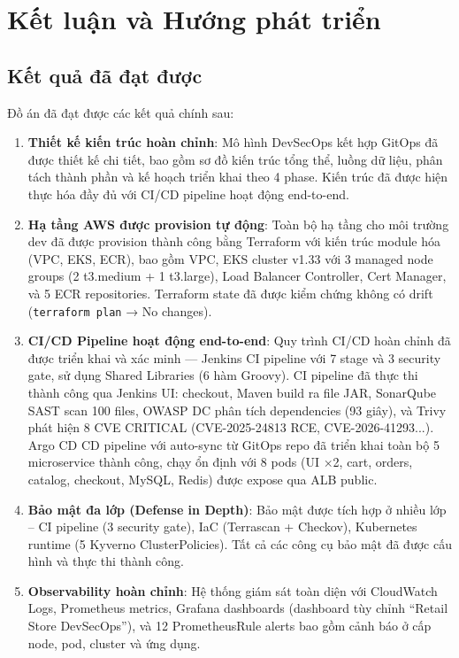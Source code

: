 \documentclass[13pt,a4paper,twoside]{extarticle}
\begin{document}
\section{Kết luận và Hướng phát triển}

\subsection{Kết quả đã đạt được}

Đồ án đã đạt được các kết quả chính sau:

\begin{enumerate}[leftmargin=*,nosep]
  \item \textbf{Thiết kế kiến trúc hoàn chỉnh}: Mô hình DevSecOps kết hợp GitOps đã được thiết kế chi tiết, bao gồm sơ đồ kiến trúc tổng thể, luồng dữ liệu, phân tách thành phần và kế hoạch triển khai theo 4 phase. Kiến trúc đã được hiện thực hóa đầy đủ với CI/CD pipeline hoạt động end-to-end.

  \item \textbf{Hạ tầng AWS được provision tự động}: Toàn bộ hạ tầng cho môi trường dev đã được provision thành công bằng Terraform với kiến trúc module hóa (VPC, EKS, ECR), bao gồm VPC, EKS cluster v1.33 với 3 managed node groups (2 t3.medium + 1 t3.large), Load Balancer Controller, Cert Manager, và 5 ECR repositories. Terraform state đã được kiểm chứng không có drift (\texttt{terraform plan} → No changes).

  \item \textbf{CI/CD Pipeline hoạt động end-to-end}: Quy trình CI/CD hoàn chỉnh đã được triển khai và xác minh --- Jenkins CI pipeline với 7 stage và 3 security gate, sử dụng Shared Libraries (6 hàm Groovy). CI pipeline đã thực thi thành công qua Jenkins UI: checkout, Maven build ra file JAR, SonarQube SAST scan 100 files, OWASP DC phân tích dependencies (93 giây), và Trivy phát hiện 8 CVE CRITICAL (CVE-2025-24813 RCE, CVE-2026-41293...). Argo CD CD pipeline với auto-sync từ GitOps repo đã triển khai toàn bộ 5 microservice thành công, chạy ổn định với 8 pods (UI ×2, cart, orders, catalog, checkout, MySQL, Redis) được expose qua ALB public.

  \item \textbf{Bảo mật đa lớp (Defense in Depth)}: Bảo mật được tích hợp ở nhiều lớp -- CI pipeline (3 security gate), IaC (Terrascan + Checkov), Kubernetes runtime (5 Kyverno ClusterPolicies). Tất cả các công cụ bảo mật đã được cấu hình và thực thi thành công.

  \item \textbf{Observability hoàn chỉnh}: Hệ thống giám sát toàn diện với CloudWatch Logs, Prometheus metrics, Grafana dashboards (dashboard tùy chỉnh ``Retail Store DevSecOps''), và 12 PrometheusRule alerts bao gồm cảnh báo ở cấp node, pod, cluster và ứng dụng.


\end{enumerate}
\end{document}
